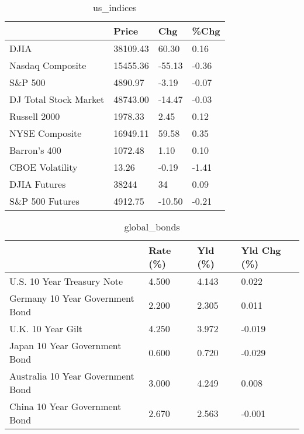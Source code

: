 \documentclass{article}%
\begin{document}
%


\begin{table}[htbp]%
\caption{us\_indices}%
\centering%
\begin{adjustbox}{width=1\textwidth}%
\begin{tabular}{llll}
\toprule
                      &    Price &    Chg &  \%Chg \\
\midrule
                 DJIA & 38109.43 &  60.30 &  0.16 \\
     Nasdaq Composite & 15455.36 & -55.13 & -0.36 \\
              S\&P 500 &  4890.97 &  -3.19 & -0.07 \\
DJ Total Stock Market & 48743.00 & -14.47 & -0.03 \\
         Russell 2000 &  1978.33 &   2.45 &  0.12 \\
       NYSE Composite & 16949.11 &  59.58 &  0.35 \\
         Barron's 400 &  1072.48 &   1.10 &  0.10 \\
      CBOE Volatility &    13.26 &  -0.19 & -1.41 \\
         DJIA Futures &    38244 &     34 &  0.09 \\
      S\&P 500 Futures &  4912.75 & -10.50 & -0.21 \\
\bottomrule
\end{tabular}
%
\end{adjustbox}%
\end{table}

%


\begin{table}[htbp]%
\caption{global\_bonds}%
\centering%
\begin{adjustbox}{width=1\textwidth}%
\begin{tabular}{llll}
\toprule
                                  & Rate (\%) & Yld (\%) & Yld Chg (\%) \\
\midrule
       U.S. 10 Year Treasury Note &    4.500 &   4.143 &       0.022 \\
  Germany 10 Year Government Bond &    2.200 &   2.305 &       0.011 \\
                U.K. 10 Year Gilt &    4.250 &   3.972 &      -0.019 \\
    Japan 10 Year Government Bond &    0.600 &   0.720 &      -0.029 \\
Australia 10 Year Government Bond &    3.000 &   4.249 &       0.008 \\
    China 10 Year Government Bond &    2.670 &   2.563 &      -0.001 \\
\bottomrule
\end{tabular}
%
\end{adjustbox}%
\end{table}
\end{document}

